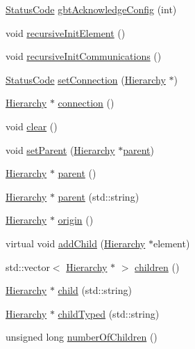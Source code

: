 \begin{DoxyCompactItemize}
\item 
\hyperlink{classStatusCode}{Status\+Code} \hyperlink{classFEB__v1_af7e7f3cb7269dc811866bc42585cf020}{gbt\+Acknowledge\+Config} (int)
\item 
void \hyperlink{classElement_a3c0abcb36f8906688bb7e32608df7086}{recursive\+Init\+Element} ()
\item 
void \hyperlink{classElement_a82119ed37dff76508a2746a853ec35ba}{recursive\+Init\+Communications} ()
\item 
\hyperlink{classStatusCode}{Status\+Code} \hyperlink{classElement_ab476b4b1df5954141ceb14f072433b89}{set\+Connection} (\hyperlink{classHierarchy}{Hierarchy} $\ast$)
\item 
\hyperlink{classHierarchy}{Hierarchy} $\ast$ \hyperlink{classElement_af57444353c1ddf9fa0109801e97debf7}{connection} ()
\item 
void \hyperlink{classHierarchy_af4d43b0765b402670eed2d62c73405af}{clear} ()
\item 
void \hyperlink{classHierarchy_a585ad1aeec16077a0e532ab8b4fc557b}{set\+Parent} (\hyperlink{classHierarchy}{Hierarchy} $\ast$\hyperlink{classHierarchy_a1c7bec8257e717f9c1465e06ebf845fc}{parent})
\item 
\hyperlink{classHierarchy}{Hierarchy} $\ast$ \hyperlink{classHierarchy_a1c7bec8257e717f9c1465e06ebf845fc}{parent} ()
\item 
\hyperlink{classHierarchy}{Hierarchy} $\ast$ \hyperlink{classHierarchy_ad550588733bf75ac5c0fcfd7c8fd11a6}{parent} (std\+::string)
\item 
\hyperlink{classHierarchy}{Hierarchy} $\ast$ \hyperlink{classHierarchy_aee461dc930ce3871636ff87f075b1b83}{origin} ()
\item 
virtual void \hyperlink{classHierarchy_ad677774ff38fcb257c04a3a10d471fac}{add\+Child} (\hyperlink{classHierarchy}{Hierarchy} $\ast$element)
\item 
std\+::vector$<$ \hyperlink{classHierarchy}{Hierarchy} $\ast$ $>$ \hyperlink{classHierarchy_aa9a76f69e98e052ee1a6e32cea006288}{children} ()
\item 
\hyperlink{classHierarchy}{Hierarchy} $\ast$ \hyperlink{classHierarchy_a1e207f973c694b538bf90107b4868817}{child} (std\+::string)
\item 
\hyperlink{classHierarchy}{Hierarchy} $\ast$ \hyperlink{classHierarchy_a0c15a5276a3b80b4354d6bd8a01e0708}{child\+Typed} (std\+::string)
\item 
unsigned long \hyperlink{classHierarchy_ab16e84de65fd84e14001a6cf941c8be4}{number\+Of\+Children} ()
\item 

\end{DoxyCompactItemize}

